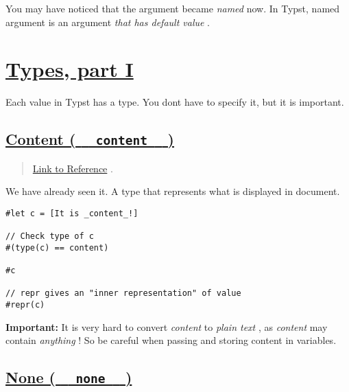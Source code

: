 \pandocbounded{}

You may have noticed that the argument became \emph{named} now. In
Typst, named argument is an argument \emph{that has default value} .

\section{\texorpdfstring{\hyperref[types-part-i]{Types, part
I}}{Types, part I}}\label{types-part-i}

Each value in Typst has a type. You don\textquotesingle t have to
specify it, but it is important.

\subsection{\texorpdfstring{\hyperref[content-content]{Content (
\texttt{\ }{\texttt{\ content\ }}\texttt{\ }
)}}{Content (   content   )}}\label{content-content}

\begin{quote}
\href{https://typst.app/docs/reference/foundations/content/}{Link to
Reference} .
\end{quote}

We have already seen it. A type that represents what is displayed in
document.

\begin{verbatim}
#let c = [It is _content_!]

// Check type of c
#(type(c) == content)

#c

// repr gives an "inner representation" of value
#repr(c)
\end{verbatim}

\pandocbounded{}

\textbf{Important:} It is very hard to convert \emph{content} to
\emph{plain text} , as \emph{content} may contain \emph{anything} ! So
be careful when passing and storing content in variables.

\subsection{\texorpdfstring{\hyperref[none-none]{None (
\texttt{\ }{\texttt{\ none\ }}\texttt{\ }
)}}{None (   none   )}}\label{none-none}

